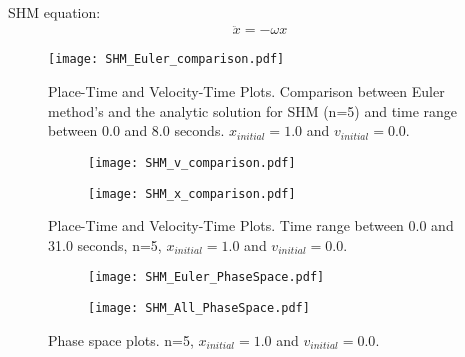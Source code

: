 \documentclass[12pt]{article}
\begin{document}
\paragraph*{}SHM equation: 
\begin{gather*}
\ddot{x}= -\omega x
\end{gather*}
\begin{figure}[H]
	\centering
	\texttt{[image: SHM\_Euler\_comparison.pdf]}
	\label{fig:mesh}
	\caption{Place-Time and Velocity-Time Plots. Comparison between Euler method's and the analytic solution for SHM (n=5) and time range between 0.0 and 8.0 seconds. $x_{initial} = 1.0$ and $v_{initial} = 0.0$.}
\end{figure}
\begin{figure}[H]
	\centering
	\begin{subfigure}{0.8\textwidth}
		\texttt{[image: SHM\_v\_comparison.pdf]}
		\label{fig:mesh4.2}
		\caption{}
	\end{subfigure}
		\begin{subfigure}{0.8\textwidth}\par\bigskip 
		\texttt{[image: SHM\_x\_comparison.pdf]}
		\label{fig:mesh4.2}
		\caption{}
	\end{subfigure}
	\label{fig:mesh}
	\caption{Place-Time and Velocity-Time Plots. Time range between 0.0 and 31.0 seconds, n=5, $x_{initial} = 1.0$ and $v_{initial} = 0.0$. }
\end{figure}
\begin{figure}[H]
	\centering
	\begin{subfigure}{0.8\textwidth}
		\texttt{[image: SHM\_Euler\_PhaseSpace.pdf]}
		\label{fig:mesh5.2}
		\caption{}
	\end{subfigure}
		\begin{subfigure}{0.8\textwidth}\par\bigskip 
		\texttt{[image: SHM\_All\_PhaseSpace.pdf]}
		\label{fig:mesh5.2}
		\caption{}
	\end{subfigure}
	\label{fig:mesh}
	\caption{Phase space plots. n=5, $x_{initial} = 1.0$ and $v_{initial} = 0.0$.}
\end{figure}
\end{document}
